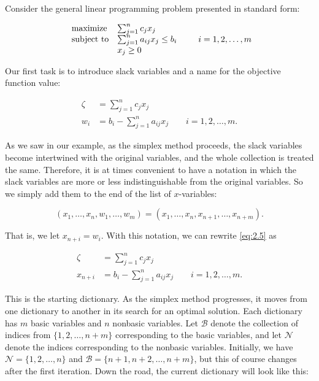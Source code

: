 \documentclass{article}
\begin{document}
    Consider the general linear programming problem presented in standard form:
    
    \[
    \begin{array}[]{ll}
    \mbox{maximize} & \sum_{j=1}^{n}c_{j}x_{j} \\
    \mbox{subject to} & \sum_{j=1}^{n}a_{ij}x_{j}\leq b_{i} \\
    & x_{j}\geq 0
    \end{array}\quad\quad i=1,2,\ldots,m
    \]
    
    Our first task is to introduce slack variables and a name for the objective function value:
    
    \begin{equation}\label{eq:2.5}
    \begin{split}
    \zeta &= \sum_{j=1}^{n}c_{j}x_{j} \\
    w_{i} &= b_{i} - \sum_{j=1}^{n}a_{ij}x_{j} \qquad i=1,2,\ldots,m.
    \end{split}
    \end{equation}
    
    As we saw in our example, as the simplex method proceeds, the slack variables become intertwined with the original variables, and the whole collection is treated the same. Therefore, it is at times convenient to have a notation in which the slack variables are more or less indistinguishable from the original variables. So we simply add them to the end of the list of \( x \)-variables:
    
    \[ (x_{1},\ldots,x_{n},w_{1},\ldots,w_{m}) = (x_{1},\ldots,x_{n},x_{n+1},\ldots,x_{n+m}). \]
    
    That is, we let \( x_{n+i} = w_{i} \). With this notation, we can rewrite \eqref{eq:2.5} as
    
    \[
    \begin{split}
    \zeta &= \sum_{j=1}^{n}c_{j}x_{j} \\
    x_{n+i} &= b_{i} - \sum_{j=1}^{n}a_{ij}x_{j} \qquad i=1,2,\ldots,m.
    \end{split}
    \]
    
    This is the starting dictionary. As the simplex method progresses, it moves from one dictionary to another in its search for an optimal solution. Each dictionary has \( m \) basic variables and \( n \) nonbasic variables. Let \( \mathcal{B} \) denote the collection of indices from \( \{1,2,\ldots,n+m\} \) corresponding to the basic variables, and let \( \mathcal{N} \) denote the indices corresponding to the nonbasic variables. Initially, we have \( \mathcal{N} = \{1,2,\ldots,n\} \) and \( \mathcal{B} = \{n+1,n+2,\ldots,n+m\} \), but this of course changes after the first iteration. Down the road, the current dictionary will look like this:
    
\end{document}
